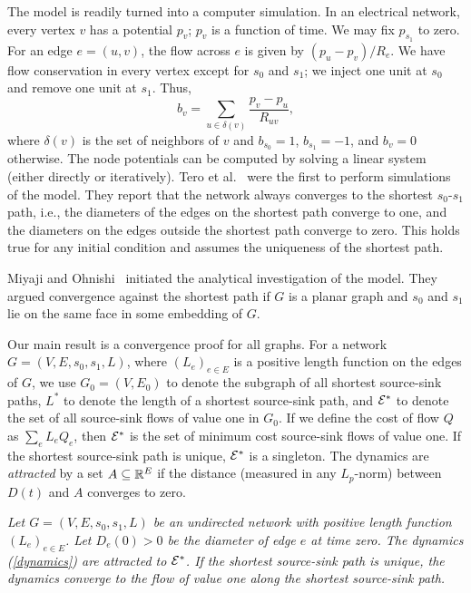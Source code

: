 \documentclass[11pt,a4paper]{article}
\newcommand{\firsttheorem}[2]{\medskip\par\noindent{\bf Theorem #1} {\it
#2}\medskip}
\renewcommand{\source}{\ensuremath{s_0}}
\renewcommand{\sink}{\ensuremath{s_1}}
\newcommand{\E}{\cal E}
\newcommand{\Estar}{\E^*}
\begin{document}
The model is readily turned into a computer simulation. In an electrical
network, every vertex $v$ has a potential $p_v$; $p_v$ is a function of
time. We may fix $p_{\sink}$ to zero. 
For an edge $e = (u,v)$, the flow across $e$ is given by $(p_u -
p_v)/R_e$. We have flow conservation in every vertex except for $\source$ and
$\sink$; we inject one unit at $\source$ and remove one unit at $\sink$. Thus,
\begin{equation}
b_v = \sum_{u \in \delta(v)} \frac{p_v - p_u}{R_{uv}}, \label{potentials}
\end{equation}
where $\delta(v)$ is the set of neighbors of $v$ and $b_{\source} = 1$, $b_{\sink}
= -1$, and $b_v = 0$ otherwise. The node potentials can be computed by solving a
linear system (either directly or iteratively).  
Tero et
al.~\cite{Tero-Kobayashi-Nakagaki} were the first to perform 
simulations of the model. They report that the network always converges to the shortest
$\source$-$\sink$ path, i.e., the diameters of the edges on the shortest path
converge to one, and the diameters on the edges outside the shortest path
converge to zero. This holds true for any initial condition and assumes the 
uniqueness of the shortest path. 

Miyaji and Ohnishi~\cite{Miyaji-Ohnish07,Miyaji-Ohnishi} initiated the analytical
investigation of the model. They argued convergence against the shortest path
if $G$ is a planar graph and $\source$ and $\sink$ lie on the same face in some
embedding of $G$. 

Our main result is a convergence proof for all graphs. For a network $G =
(V,E,\source,\sink,L)$, where $(L_e)_{e \in E}$ is a positive length function
on the edges of $G$, we use $G_0 = (V,E_0)$ to denote the subgraph of all
shortest source-sink paths, $L^*$ to denote the length of a shortest
source-sink path, and $\Estar$ to denote the set of all source-sink flows of
value one in $G_0$. If we define the cost of flow $Q$ as $\sum_e L_e Q_e$, then
$\Estar$ is the set of minimum cost source-sink flows of value one. If the
shortest source-sink path is unique, $\Estar$ is a singleton. The 
dynamics are \emph{attracted} by a set $A \subseteq \mathbb{R}^E$ if the distance (measured in any
$L_p$-norm) between $D(t)$ and $A$ converges to zero. 



\firsttheorem{[Theorem~\ref{thm:main-apx} in
Section~\ref{sec:Convergence-General}]}{Let $G = (V,E,\source,\sink,L)$ be an undirected network with positive length
function $(L_e)_{e \in E}$. Let $D_e(0) > 0$ be the diameter of edge $e$ at time
zero. 
The dynamics (\ref{dynamics}) are attracted to $\Estar$. If the
shortest source-sink path is unique, the dynamics converge to the flow of value
one along the shortest source-sink path.}
\end{document}
